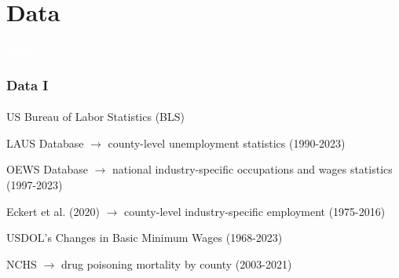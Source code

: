 

\section{Data}

\begin{transitionframe}

    \rmfamily %
    
    \begin{center}
    {\Huge \textbf{\textcolor{white}{Data}}}
    \end{center}
  
\end{transitionframe}

\begin{frame}

    \frametitle{Data I} %
    \framesubtitle{}  %
    \rmfamily %

    \begin{wideitemize}
        \item \textcolor{fgre}{US Bureau of Labor Statistics (BLS)}  
        \vspace{9pt}
        \begin{wideitemize}
            \item[\textcolor{fgre}{\textbullet}] \textcolor{fgre}{LAUS Database} \(\to\) county-level unemployment statistics (1990-2023)
            \item[\textcolor{fgre}{\textbullet}] \textcolor{fgre}{OEWS Database} \(\to\) national industry-specific occupations and wages statistics (1997-2023) %
        \end{wideitemize}
        \item \textcolor{fgre}{Eckert et al. (2020)} \(\to\) county-level industry-specific employment (1975-2016) 
        \item \textcolor{fgre}{USDOL's Changes in Basic Minimum Wages} (1968-2023)
        \item \textcolor{fgre}{NCHS} \(\to\) drug poisoning mortality by county (2003-2021)
    \end{wideitemize}

\end{frame}


